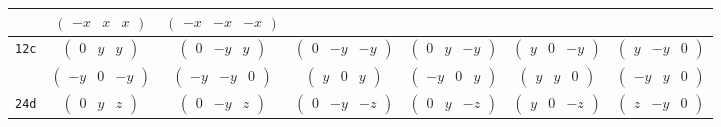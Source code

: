 \documentclass[fleqn,9pt,landscape]{jsarticle}
\begin{document}
\begin{center}
\begin{longtable}{ccccccc}
& $ \begin{pmatrix} - x & x & x \end{pmatrix} $ & $ \begin{pmatrix} - x & - x & - x \end{pmatrix} $ & $  $ & $  $ & $  $ & $  $ \\ \hline
{\tt 12c} & $ \begin{pmatrix} 0 & y & y \end{pmatrix} $ & $ \begin{pmatrix} 0 & - y & y \end{pmatrix} $ & $ \begin{pmatrix} 0 & - y & - y \end{pmatrix} $ & $ \begin{pmatrix} 0 & y & - y \end{pmatrix} $ & $ \begin{pmatrix} y & 0 & - y \end{pmatrix} $ & $ \begin{pmatrix} y & - y & 0 \end{pmatrix} $ \\
& $ \begin{pmatrix} - y & 0 & - y \end{pmatrix} $ & $ \begin{pmatrix} - y & - y & 0 \end{pmatrix} $ & $ \begin{pmatrix} y & 0 & y \end{pmatrix} $ & $ \begin{pmatrix} - y & 0 & y \end{pmatrix} $ & $ \begin{pmatrix} y & y & 0 \end{pmatrix} $ & $ \begin{pmatrix} - y & y & 0 \end{pmatrix} $ \\ \hline
{\tt 24d} & $ \begin{pmatrix} 0 & y & z \end{pmatrix} $ & $ \begin{pmatrix} 0 & - y & z \end{pmatrix} $ & $ \begin{pmatrix} 0 & - y & - z \end{pmatrix} $ & $ \begin{pmatrix} 0 & y & - z \end{pmatrix} $ & $ \begin{pmatrix} y & 0 & - z \end{pmatrix} $ & $ \begin{pmatrix} z & - y & 0 \end{pmatrix} $ \\

\end{longtable}
\end{center}
\end{document}
